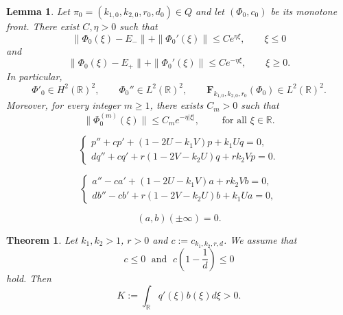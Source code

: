 \documentclass[10pt,a4paper]{amsart}
\newtheorem{lemma}{Lemma}
\newtheorem{theorem}{Theorem}
\def \F {\mathbf{F}}
\def \R {\mathbb{R}}
\def \c{c_{k_1,k_2,r,d}}
\begin{document}
\begin{lemma}\label{lemdecay} Let $\pi_0=(k_{1,0}, k_{2,0},r_0,d_0) \in Q$ and let $(\Phi_0, c_0)$ be its monotone front. There exist $C,\eta>0$ such that
	\begin{equation}\label{cy0}
		\|\Phi_0(\xi)-E_-\| + \|\Phi_0'(\xi)\|  \leq C e^{\eta\xi}, \qquad \xi\leq 0
	\end{equation}
	and 
	\begin{equation}\label{cy1}
		\|\Phi_0(\xi)-E_+\| + \|\Phi_0'(\xi)\|  \leq C e^{-\eta\xi}, \qquad \xi\geq 0.
	\end{equation}
	In particular,
	\begin{equation}\label{cy2}
		\Phi'_0\in H^2(\R)^2, \qquad \Phi_0'' \in L^2(\R)^2, \qquad \F_{k_{1,0}, k_{2,0},r_0}(\Phi_0)\in L^2(\R)^2.
	\end{equation}
Moreover, for every integer $m\geq 1$, there exists $C_m>0$ such that
	\begin{equation}\label{generaldecay}
		\|\Phi_0^{(m)}(\xi)\|\leq C_me^{-\eta|\xi|}, \qquad \text{ for all } \xi\in \R.
	\end{equation}
\end{lemma}

\begin{equation}\label{syst2new}
	\left\{ 
	\begin{array}{llllll}
		p''+cp'+(1-2U-k_1V)p+k_1Uq=0,\\
		dq''+cq'+r(1-2V-k_2U)q+rk_2Vp=0.
	\end{array} 
	\right.
\end{equation}

\begin{equation}\label{systab}
	\left\{ 
	\begin{array}{llllll}
		a''-ca'+(1-2U-k_1V)a+rk_2Vb=0,\\
		db''-cb'+r(1-2V-k_2U)b+k_1Ua=0,
	\end{array} 
	\right.
\end{equation}

\begin{equation}\label{limab}
(a,b)(\pm \infty)=0.
\end{equation}

\begin{theorem}\label{theoimportant}
	Let $k_1,k_2>1$, $r>0$ and  $c:=\c$. We assume that 
	\begin{equation}\label{condition}
	c\leq 0	 \; \text{ and }\; c\left(1-\frac{1}{d}\right)\leq 0
	\end{equation}
hold. Then
	\begin{equation}\label{eq04}
		K:=\int_{\R}q'(\xi)b(\xi)d\xi>0.
	\end{equation}
\end{theorem}
\end{document}
